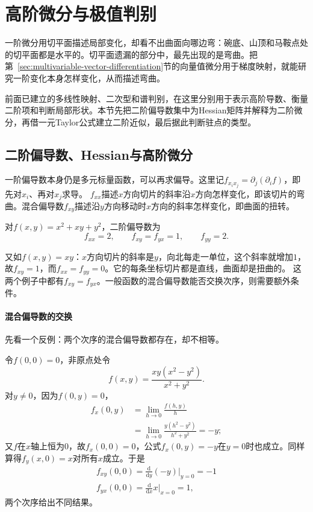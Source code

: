 \section{高阶微分与极值判别}
\label{sec:multivariable-curvature-error}

一阶微分用切平面描述局部变化，却看不出曲面向哪边弯：碗底、山顶和马鞍点处的切平面都是水平的。切平面遗漏的部分中，最先出现的是弯曲。把第~\ref{sec:multivariable-vector-differentiation}节的向量值微分用于梯度映射，就能研究一阶变化本身怎样变化，从而描述弯曲。

前面已建立的多线性映射、二次型和谱判别，在这里分别用于表示高阶导数、衡量二阶项和判断局部形状。本节先把二阶偏导数集中为Hessian矩阵并解释为二阶微分，再借一元Taylor公式建立二阶近似，最后据此判断驻点的类型。

\subsection{二阶偏导数、Hessian与高阶微分}

一阶偏导数本身仍是多元标量函数，可以再求偏导。这里记$f_{x_i x_j}=\partial_j(\partial_i f)$，即先对$x_i$、再对$x_j$求导。
$f_{xx}$描述$x$方向切片的斜率沿$x$方向怎样变化，即该切片的弯曲。混合偏导数$f_{xy}$描述沿$y$方向移动时$x$方向的斜率怎样变化，即曲面的扭转。

对$f(x,y)=x^2+xy+y^2$，二阶偏导数为
\[
 f_{xx}=2,\qquad f_{xy}=f_{yx}=1,\qquad f_{yy}=2.
\]

又如$f(x,y)=xy$：$x$方向切片的斜率是$y$，向北每走一单位，这个斜率就增加$1$，故$f_{xy}=1$，而$f_{xx}=f_{yy}=0$。它的每条坐标切片都是直线，曲面却是扭曲的。
这两个例子中都有$f_{xy}=f_{yx}$。一般函数的混合偏导数能否交换次序，则需要额外条件。

\paragraph{混合偏导数的交换}
先看一个反例：两个次序的混合偏导数都存在，却不相等。
\begin{example}[混合偏导数与求导次序有关]
\label{ex:multivariable-mixed-partials-differ}
令$f(0,0)=0$，非原点处令
\[
 f(x,y)=\frac{xy(x^2-y^2)}{x^2+y^2}.
\]
对$y\neq0$，因为$f(0,y)=0$，
\[
 \begin{aligned}
 f_x(0,y)&=\lim_{h\to0}\frac{f(h,y)}h\\
 &=\lim_{h\to0}\frac{y(h^2-y^2)}{h^2+y^2}=-y;
 \end{aligned}
\]
又$f$在$x$轴上恒为$0$，故$f_x(0,0)=0$，公式$f_x(0,y)=-y$在$y=0$时也成立。同样算得$f_y(x,0)=x$对所有$x$成立。于是
\[
 \begin{gathered}
f_{xy}(0,0)=\frac{\mathrm d}{\mathrm dy}(-y)\Big|_{y=0}=-1\\
f_{yx}(0,0)=\frac{\mathrm d}{\mathrm dx}x\Big|_{x=0}=1,
 \end{gathered}
\]
两个次序给出不同结果。
\end{example}

